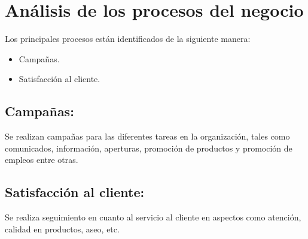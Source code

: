 \section{An\'alisis de los procesos del negocio}
Los principales procesos est\'an identificados de la siguiente manera:%
	\begin{itemize}
		\item Campa\~nas.
		\item Satisfacci\'on al cliente.
	\end{itemize}
\subsection{Campa\~nas:}
Se realizan campa\~nas para las diferentes tareas en la organizaci\'on, tales como comunicados, informaci\'on, aperturas, promoci\'on de productos y promoci\'on de empleos entre otras.%
%
\subsection{Satisfacci\'on al cliente:}Se realiza seguimiento en cuanto al servicio al cliente en aspectos como atenci\'on, calidad en productos, aseo, etc.%
%
